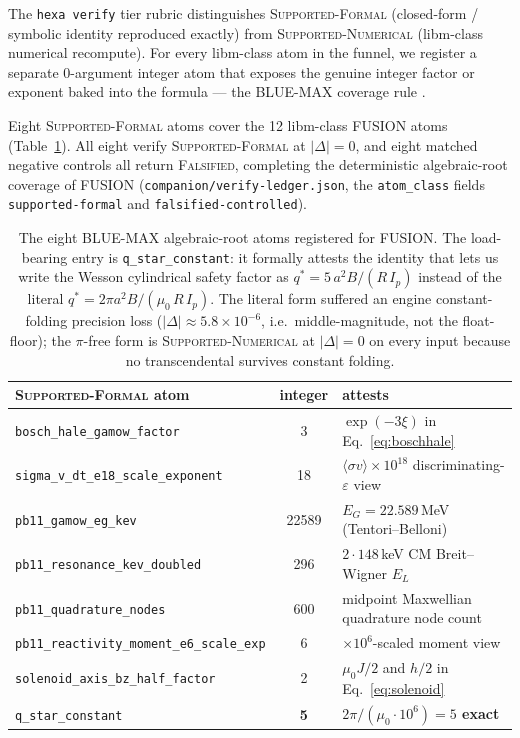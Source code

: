 \documentclass[11pt,a4paper]{article}
\begin{document}
The \texttt{hexa verify} tier rubric distinguishes
\textsc{Supported-Formal} (closed-form / symbolic identity reproduced
exactly) from \textsc{Supported-Numerical} (libm-class numerical
recompute). For every libm-class atom in the funnel, we register a
separate 0-argument integer atom that exposes the genuine integer
factor or exponent baked into the formula --- the BLUE-MAX coverage
rule \citep{anthropic2026hexag69}.

Eight \textsc{Supported-Formal} atoms cover the 12 libm-class FUSION
atoms (Table~\ref{tab:bluemax}). All eight verify
\textsc{Supported-Formal} at $|\Delta|=0$, and eight matched
negative controls all return \textsc{Falsified}, completing the
deterministic algebraic-root coverage of FUSION
(\texttt{companion/\allowbreak verify-ledger.json}, the
\verb|atom_class| fields \texttt{supported-formal} and
\texttt{falsified-controlled}).

\begin{table}[h]
\centering
\small
\begin{tabular}{lcl}
\toprule
\textsc{Supported-Formal} atom & integer & attests \\
\midrule
\verb|bosch_hale_gamow_factor|             & 3     & $\exp(-3\xi)$ in Eq.~\eqref{eq:boschhale} \\
\verb|sigma_v_dt_e18_scale_exponent|       & 18    & $\langle\sigma v\rangle\!\times\!10^{18}$ discriminating-$\varepsilon$ view \\
\verb|pb11_gamow_eg_kev|                   & 22589 & $E_G = 22.589$\,MeV (Tentori--Belloni) \\
\verb|pb11_resonance_kev_doubled|          & 296   & $2\cdot148$\,keV CM Breit--Wigner $E_L$ \\
\verb|pb11_quadrature_nodes|               & 600   & midpoint Maxwellian quadrature node count \\
\verb|pb11_reactivity_moment_e6_scale_exp| & 6     & $\times10^{6}$-scaled moment view \\
\verb|solenoid_axis_bz_half_factor|        & 2     & $\mu_0 J/2$ and $h/2$ in Eq.~\eqref{eq:solenoid} \\
\verb|q_star_constant|                     & \textbf{5} & \textbf{$2\pi/(\mu_0\!\cdot\!10^{6}) = 5$ exact} \\
\bottomrule
\end{tabular}
\caption{The eight BLUE-MAX algebraic-root atoms registered for
FUSION. The load-bearing entry is \texttt{q\_star\_constant}: it
formally attests the identity that lets us write the Wesson
cylindrical safety factor as $q^{*} = 5\,a^{2}B / (R\,I_{p})$ instead
of the literal $q^{*} = 2\pi a^{2} B / (\mu_0\,R\,I_{p})$. The literal
form suffered an engine constant-folding precision loss
($|\Delta|\approx 5.8\!\times\!10^{-6}$, i.e.\ middle-magnitude, not
the float-floor); the $\pi$-free form is \textsc{Supported-Numerical}
at $|\Delta|=0$ on every input because no transcendental survives
constant folding.}
\label{tab:bluemax}
\end{table}
\end{document}
